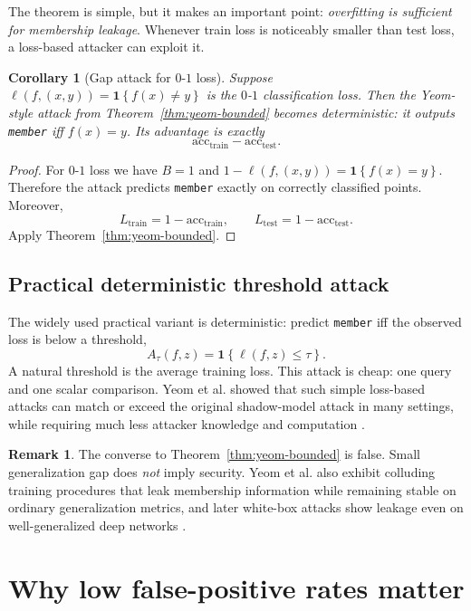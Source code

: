 \documentclass[11pt]{article}
\newtheorem{corollary}[theorem]{Corollary}
\theoremstyle{definition}
\newtheorem{remark}[theorem]{Remark}
\newcommand{\1}{\mathbf{1}}
\newcommand{\Loss}{\ell}
\newcommand{\acc}{\mathrm{acc}}
\newcommand{\Ind}[1]{\mathbf{1}\!\left\{#1\right\}}
\begin{document}
The theorem is simple, but it makes an important point: \emph{overfitting is sufficient for membership leakage}. Whenever train loss is noticeably smaller than test loss, a loss-based attacker can exploit it.

\begin{corollary}[Gap attack for $0$-$1$ loss]\label{cor:gap}
Suppose $\Loss(f,(x,y)) = \Ind{f(x) \ne y}$ is the $0$-$1$ classification loss. Then the Yeom-style attack from Theorem~\ref{thm:yeom-bounded} becomes deterministic: it outputs \texttt{member} iff $f(x)=y$. Its advantage is exactly
\[
\acc_{\mathrm{train}} - \acc_{\mathrm{test}}.
\]
\end{corollary}

\begin{proof}
For $0$-$1$ loss we have $B=1$ and $1-\Loss(f,(x,y)) = \Ind{f(x)=y}$. Therefore the attack predicts \texttt{member} exactly on correctly classified points. Moreover,
\[
L_{\mathrm{train}} = 1-\acc_{\mathrm{train}},
\qquad
L_{\mathrm{test}} = 1-\acc_{\mathrm{test}}.
\]
Apply Theorem~\ref{thm:yeom-bounded}.
\end{proof}

\subsection{Practical deterministic threshold attack}

The widely used practical variant is deterministic: predict \texttt{member} iff the observed loss is below a threshold,
\[
A_\tau(f,z) = \Ind{\Loss(f,z) \le \tau}.
\]
A natural threshold is the average training loss. This attack is cheap: one query and one scalar comparison. Yeom et al. showed that such simple loss-based attacks can match or exceed the original shadow-model attack in many settings, while requiring much less attacker knowledge and computation \cite{yeom2018}.

\begin{remark}
The converse to Theorem~\ref{thm:yeom-bounded} is false. Small generalization gap does \emph{not} imply security. Yeom et al. also exhibit colluding training procedures that leak membership information while remaining stable on ordinary generalization metrics, and later white-box attacks show leakage even on well-generalized deep networks \cite{yeom2018,nasr2019}.
\end{remark}

\section{Why low false-positive rates matter}
\end{document}
